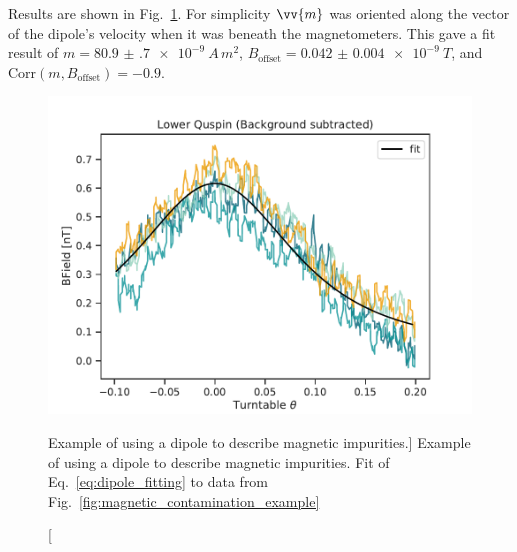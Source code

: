 Results are shown in Fig.~\ref{fig:lower_quspin_contamination_fit}. For simplicity $\vv{m}$ was oriented along the vector of the dipole's velocity when it was beneath the magnetometers. This gave a fit result of $m=\qty{80.9(7)e-9}{A\,m^2}$, $B_\text{offset}=\qty{0.042(4)e-9}{T}$, and $\text{Corr}(m, B_\text{offset})=-0.9$.


\begin{figure}
    \centering
    \includegraphics[width=0.7 \textwidth]{figures/quspin_fit.pdf}
    \caption
    [Example of using a dipole to describe magnetic impurities.]
    {Example of using a dipole to describe magnetic impurities. Fit of Eq.~\ref{eq:dipole_fitting} to data from Fig.~\ref{fig:magnetic_contamination_example}}
    \label{fig:lower_quspin_contamination_fit}
\end{figure}